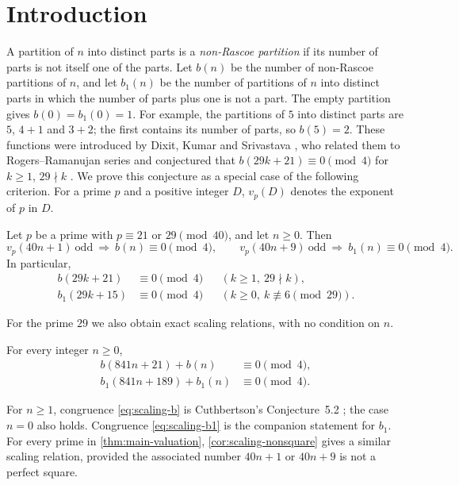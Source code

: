 \section{Introduction}\label{sec:intro}

A partition of $n$ into distinct parts is a \emph{non-Rascoe partition} if its
number of parts is not itself one of the parts. Let $b(n)$ be the number of
non-Rascoe partitions of $n$, and let $b_1(n)$ be the number of partitions of
$n$ into distinct parts in which the number of parts plus one is not a part.
The empty partition gives $b(0)=b_1(0)=1$. For example, the partitions of $5$
into distinct parts are $5$, $4+1$ and $3+2$; the first contains its number of
parts, so $b(5)=2$. These functions were introduced by Dixit, Kumar and
Srivastava \cite{DKS}, who related them to Rogers--Ramanujan series and
conjectured that $b(29k+21)\equiv0\pmod4$ for $k\ge1$, $29\nmid k$
\cite[Conjecture~1]{DKS}. We prove this conjecture as a special case of the
following criterion. For a prime $p$ and a positive integer $D$, $v_p(D)$
denotes the exponent of $p$ in $D$.

\begin{theorem}\label{thm:main-valuation}
Let $p$ be a prime with $p\equiv21$ or $29\pmod{40}$, and let $n\ge0$. Then
\[
  v_p(40n+1)\ \text{odd}\ \Longrightarrow\ b(n)\equiv0\pmod4,\qquad
  v_p(40n+9)\ \text{odd}\ \Longrightarrow\ b_1(n)\equiv0\pmod4.
\]
In particular,
\begin{align*}
  b(29k+21)&\equiv0\pmod4&&(k\ge1,\ 29\nmid k),\\
  b_1(29k+15)&\equiv0\pmod4&&(k\ge0,\ k\not\equiv6\pmod{29}).
\end{align*}
\end{theorem}

For the prime $29$ we also obtain exact scaling relations, with no condition
on $n$.

\begin{theorem}\label{thm:main-scaling}
For every integer $n\ge0$,
\begin{align}
  b(841n+21)+b(n)&\equiv0\pmod4,\label{eq:scaling-b}\\
  b_1(841n+189)+b_1(n)&\equiv0\pmod4.\label{eq:scaling-b1}
\end{align}
\end{theorem}

For $n\ge1$, congruence \eqref{eq:scaling-b} is Cuthbertson's Conjecture~5.2
\cite{Cuthbertson}; the case $n=0$ also holds. Congruence \eqref{eq:scaling-b1}
is the companion statement for $b_1$. For every prime in \cref{thm:main-valuation},
\cref{cor:scaling-nonsquare} gives a similar scaling relation, provided the
associated number $40n+1$ or $40n+9$ is not a perfect square.

